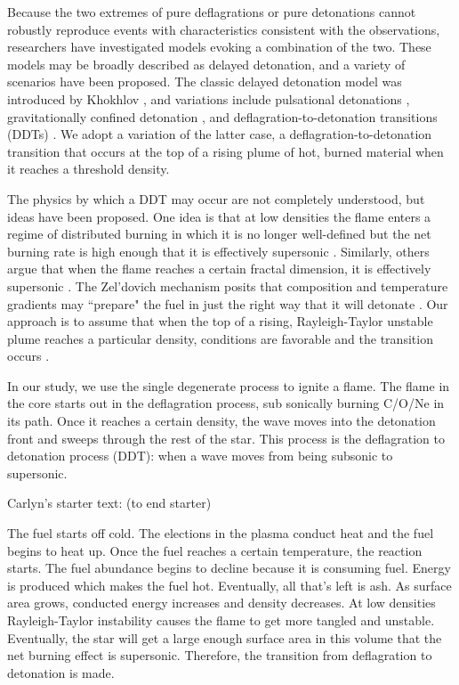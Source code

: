 \documentclass[iop,apj]{emulateapj}
\begin{document}
Because the two extremes of pure deflagrations or pure detonations cannot
robustly reproduce events with characteristics consistent with the observations,
researchers have investigated models evoking a combination of the two. These models
may be broadly described as delayed detonation, and a variety of scenarios have
been proposed. The classic delayed detonation model was introduced by
Khokhlov \cite{Khokhlov1991Delayed-detonat,hoflich.khokhlov.ea:delayed,GameKhokOran05},
and variations include pulsational
detonations \cite{ivanovaetal1974,Khokhlov1991Delayed-detonat,
arnettlivne94a, arnettlivne94b, bravogarcia-senz2006},
gravitationally confined detonation \cite{PlewCaldLamb04,Jordan2008Three-Dimension,
jordanetal2012}, and deflagration-to-detonation
transitions (DDTs) \cite{1986SvAL,Khokhlov1991Delayed-detonat,NiemWoos97,Niem99,belletal2004,
fishjump2015}. We adopt a variation of the latter case, a deflagration-to-detonation transition
that occurs at the top of a rising plume of hot, burned material when it
reaches a threshold density.

The physics by which a DDT may occur are not completely understood, but
ideas have been proposed. One idea is that at low densities the flame
enters a regime of distributed burning in which it is no longer
well-defined but the net burning rate is high enough that it is
effectively supersonic \cite{NiemWoos97}. Similarly, others argue
that when the flame reaches a certain fractal dimension, it is
effectively supersonic \cite{woosley90}. The Zel'dovich mechanism
posits that composition and temperature gradients may ``prepare" the
fuel in just the right way that it will detonate
\cite{zeldovichetal1970,KhokOranWhee97,jacketal2014}. Our approach
is to assume that when the top of a rising, Rayleigh-Taylor unstable
plume reaches a particular density, conditions are favorable and the
transition occurs \cite{townsley.calder.ea:flame}.



In our study, we use the single degenerate process to ignite a flame. The
flame in the core starts out in the deflagration process, sub sonically
burning C/O/Ne in its path. Once it reaches a certain density, the
wave moves into the detonation front and sweeps through the rest of
the star. This process is the deflagration to detonation process (DDT):
when a wave moves from being subsonic to supersonic.

Carlyn's starter text: (to end starter)

The fuel starts off cold. The elections in the plasma conduct heat
and the fuel begins to heat up. Once the fuel reaches a certain
temperature, the reaction starts. The fuel abundance begins to
decline because it is consuming fuel. Energy is produced which
makes the fuel hot. Eventually, all that’s left is ash. As
surface area grows, conducted energy increases and density
decreases. At low densities Rayleigh-Taylor instability causes
the flame to get more tangled and unstable. Eventually, the
star will get a large enough surface area in this volume that
the net burning effect is supersonic. Therefore, the transition
from deflagration to detonation is made.
\end{document}
